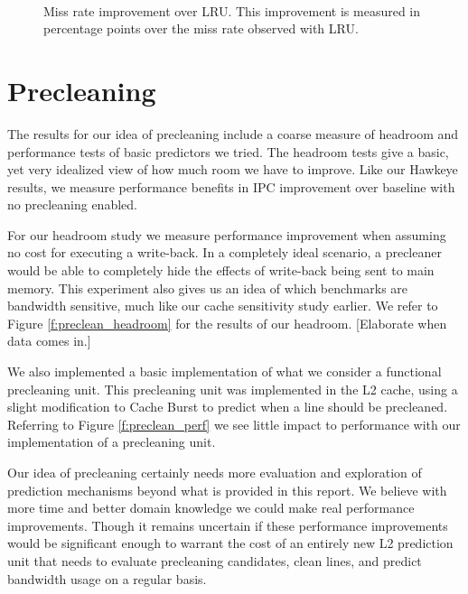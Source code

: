 \begin{figure}[htb]
\begin{center}
\ 
\caption{Miss rate improvement over LRU. This improvement is measured in percentage points over the miss rate observed with LRU.}
\label{f:hawkeye_pw_miss_rate}
\end{center}
\end{figure}

\section{Precleaning}

The results for our idea of precleaning include a coarse measure of headroom and performance tests of basic predictors we tried. The headroom tests give a basic, yet very idealized view of how much room we have to improve. Like our Hawkeye results, we measure performance benefits in IPC improvement over baseline with no precleaning enabled.

For our headroom study we measure performance improvement when assuming no cost for executing a write-back. In a completely ideal scenario, a precleaner would be able to completely hide the effects of write-back being sent to main memory. This experiment also gives us an idea of which benchmarks are bandwidth sensitive, much like our cache sensitivity study earlier. We refer to Figure \ref{f:preclean_headroom} for the results of our headroom. [Elaborate when data comes in.]

We also implemented a basic implementation of what we consider a functional precleaning unit. This precleaning unit was implemented in the L2 cache, using a slight modification to Cache Burst \cite{cache_burst} to predict when a line should be precleaned. Referring to Figure \ref{f:preclean_perf} we see little impact to performance with our implementation of a precleaning unit.

Our idea of precleaning certainly needs more evaluation and exploration of prediction mechanisms beyond what is provided in this report. We believe with more time and better domain knowledge we could make real performance improvements. Though it remains uncertain if these performance improvements would be significant enough to warrant the cost of an entirely new L2 prediction unit that needs to evaluate precleaning candidates, clean lines, and predict bandwidth usage on a regular basis.
